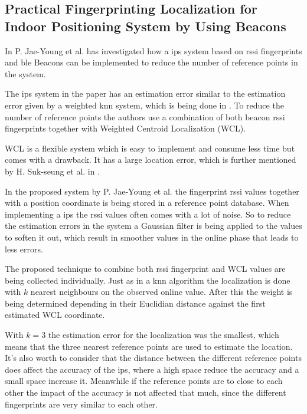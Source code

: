 \subsection{Practical Fingerprinting Localization for Indoor Positioning System by Using Beacons}\label{sec:}
In \cite{PracticalFingerprintingLocalization2017} P. Jae-Young et al. has investigated how a \acrshort{ips} system based on \acrshort{rssi} fingerprints and \acrshort{ble} Beacons can be implemented to reduce the number of reference points in the system.

\bigskip

The \acrshort{ips} system in the paper has an estimation error similar to the estimation error given by a weighted \acrshort{knn} system, which is being done in \cite{ImprovingIndoorLocalization2016}.
To reduce the number of reference points the authors use a combination of both beacon \acrshort{rssi} fingerprints together with Weighted Centroid Localization (WCL). 

\bigskip

WCL is a flexible system which is easy to implement and consume less time but comes with a drawback. 
It has a large location error, which is further mentioned by H. Suk-seung et al. in \cite{BeaconBasedIndoor2016}.

\bigskip

In the proposed system by P. Jae-Young et al. the fingerprint \acrshort{rssi} values together with a position coordinate is being stored in a reference point database.
When implementing a \acrshort{ips} the \acrshort{rssi} values often comes with a lot of noise.
So to reduce the estimation errors in the system a Gaussian filter is being applied to the values to soften it out, which result in smoother values in the online phase that leads to less errors.

\bigskip

The proposed technique to combine both \acrshort{rssi} fingerprint and WCL values are being collected individually.
Just as in a \acrshort{knn} algorithm the localization is done with $k$ nearest neighbours on the observed online value.
After this the weight is being determined depending in their Euclidian distance against the first estimated WCL coordinate.

\bigskip

With $k=3$ the estimation error for the localization was the smallest, which means that the three nearest reference points are used to estimate the location.
It's also worth to consider that the distance between the different reference points does affect the accuracy of the \acrshort{ips}, where a high space reduce the accuracy and a small space increase it.
Meanwhile if the reference points are to close to each other the impact of the accuracy is not affected that much, since the different fingerprints are very similar to each other.

